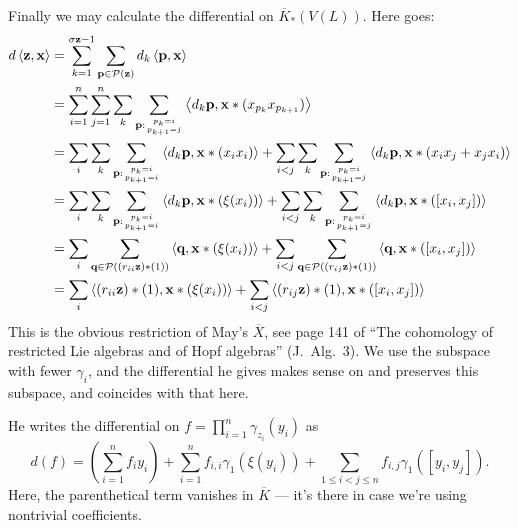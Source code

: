 \documentclass[11pt]{article}
\newcommand{\restn}[1]{\xi{#1}}
\begin{document}
\begin{PRlieKoszulComplexCalculation}
Finally we may calculate the differential on $\overline{K}_*(V(L))$. Here goes:
\begin{alignat*}{2}
d\left\langle \textbf{z},\textbf{x}\right\rangle
&=
\sum_{k=1}^{\sigma\textbf{z}-1} \sum_{\textbf{p}\in\calP(\textbf{z})}d_k\left\langle \textbf{p},\textbf{x}\right\rangle%
\\
&=
\sum_{i=1}^{n}\sum_{j=1}^{n}\sum_{k}\sum_{\textbf{p}:{p_k=i\atop p_{k+1}=j}}\left\langle d_k\textbf{p},\textbf{x}*(x_{p_k}x_{p_{k+1}})\right\rangle%
\\
&=
\sum_{i}\sum_{k}\sum_{\textbf{p}:{p_k=i\atop p_{k+1}=i}}\left\langle d_k\textbf{p},\textbf{x}*(x_ix_i)\right\rangle+\sum_{i<j} \sum_{k}\sum_{\textbf{p}:{p_k=i\atop p_{k+1}=j}}\left\langle d_k\textbf{p},\textbf{x}*(x_ix_j+x_jx_i)\right\rangle%
\\
&=
\sum_{i}\sum_{k}\sum_{\textbf{p}:{p_k=i\atop p_{k+1}=i}}\left\langle d_k\textbf{p},\textbf{x}*\left(\restn{(x_i)}\right)\right\rangle+ \sum_{i<j}\sum_{k}\sum_{\textbf{p}:{p_k=i\atop p_{k+1}=j}}\left\langle d_k\textbf{p},\textbf{x}*\left([x_i,x_j]\right)\right\rangle%
\\
&=
\sum_{i}\sum_{\textbf{q}\in\calP((r_{ii}\textbf{z})*(1))}\left\langle \textbf{q},\textbf{x}*\left(\restn{(x_i)}\right)\right\rangle+\sum_{i<j} \sum_{\textbf{q}\in\calP((r_{ij}\textbf{z})*(1))}\left\langle \textbf{q},\textbf{x}*\left([x_i,x_j]\right)\right\rangle%
\\
&=
\sum_{i}\left\langle (r_{ii}\textbf{z})*(1),\textbf{x}*\left(\restn{(x_i)}\right)\right\rangle+\sum_{i<j} \left\langle (r_{ij}\textbf{z})*(1),\textbf{x}*\left([x_i,x_j]\right)\right\rangle%
\end{alignat*}
This is the obvious restriction of May's $\overline{X}$, see page 141 of ``The cohomology of restricted Lie algebras and of Hopf algebras'' (J.\ Alg.\ 3). We use the subspace with fewer $\gamma_i$, and the differential he gives makes sense on and preserves this subspace, and coincides with that here.

He writes the differential on $f=\prod_{i=1}^{n}\gamma_{z_i}(y_i)$ as
\[d(f)=\left(\sum_{i=1}^{n}f_iy_i\right)+ \sum_{i=1}^{n}f_{i,i}\gamma_1(\restn{(y_i)})+\sum_{1\leq i<j\leq n}f_{i,j}\gamma_1([y_i,y_j]).\]
Here, the parenthetical term vanishes in $\overline{K}$ --- it's there in case we're using nontrivial coefficients.
\end{PRlieKoszulComplexCalculation}

\end{document}
